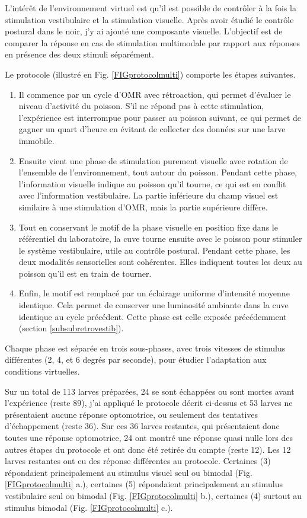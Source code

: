 L'intérêt de l'environnement virtuel est qu'il est possible de contrôler à la fois la stimulation vestibulaire et la stimulation visuelle. Après avoir étudié le contrôle postural dans le noir, j'y ai ajouté une composante visuelle. L'objectif est de comparer la réponse en cas de stimulation multimodale par rapport aux réponses en présence des deux stimuli séparément.

Le protocole (illustré en Fig. \ref{FIGprotocolmulti}) comporte les étapes suivantes. 

\begin{enumerate}
    \item Il commence par un cycle d'OMR avec rétroaction, qui permet d'évaluer le niveau d'activité du poisson. S'il ne répond pas à cette stimulation, l'expérience est interrompue pour passer au poisson suivant, ce qui permet de gagner un quart d'heure en évitant de collecter des données sur une larve immobile.
    \item Ensuite vient une phase de stimulation purement visuelle avec rotation de l'ensemble de l'environnement, tout autour du poisson. Pendant cette phase, l'information visuelle indique au poisson qu'il tourne, ce qui est en conflit avec l'information vestibulaire. La partie inférieure du champ visuel est similaire à une stimulation d'OMR, mais la partie supérieure diffère.
    \item Tout en conservant le motif de la phase visuelle en position fixe dans le référentiel du laboratoire, la cuve tourne ensuite avec le poisson pour stimuler le système vestibulaire, utile au contrôle postural. Pendant cette phase, les deux modalités sensorielles sont cohérentes. Elles indiquent toutes les deux au poisson qu'il est en train de tourner.
    \item Enfin, le motif est remplacé par un éclairage uniforme d'intensité moyenne identique. Cela permet de conserver une luminosité ambiante dans la cuve identique au cycle précédent. Cette phase est celle exposée précédemment (section \ref{subsubretrovestib}).
\end{enumerate}

Chaque phase est séparée en trois sous-phases, avec trois vitesses de stimulus différentes (2, 4, et 6 degrés par seconde), pour étudier l'adaptation aux conditions virtuelles.


Sur un total de 113 larves préparées, 24 se sont échappées ou sont mortes avant l'expérience (reste 89), j'ai appliqué le protocole décrit ci-dessus et 53 larves ne présentaient aucune réponse optomotrice, ou seulement des tentatives d'échappement (reste 36). Sur ces 36 larves restantes, qui présentaient donc toutes une réponse optomotrice, 24 ont montré une réponse quasi nulle lors des autres étapes du protocole et ont donc été retirée du compte (reste 12). Les 12 larves restantes ont eu des réponse différentes au protocole. Certaines (3) répondaient principalement au stimulus visuel seul ou bimodal (Fig. \ref{FIGprotocolmulti} a.), certaines (5) répondaient principalement au stimulus vestibulaire seul ou bimodal (Fig. \ref{FIGprotocolmulti} b.), certaines (4) surtout au stimulus bimodal (Fig. \ref{FIGprotocolmulti} c.).

